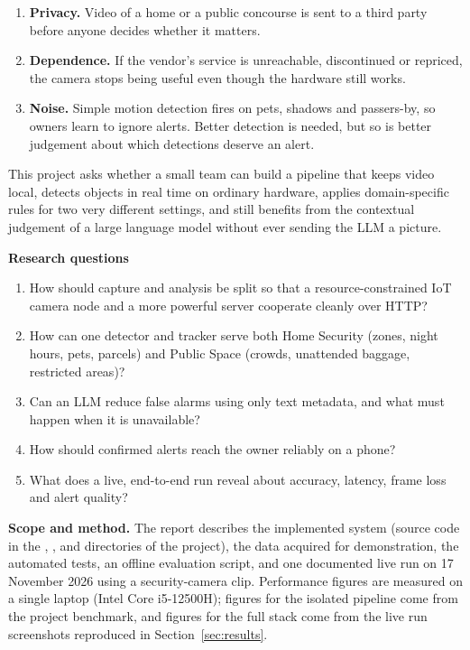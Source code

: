 \documentclass[11pt]{article}
\DeclareRobustCommand{\code}[1]{\texttt{\detokenize{#1}}}
\begin{document}
\begin{enumerate}
  \item \textbf{Privacy.} Video of a home or a public concourse is sent to a third party before anyone decides whether it matters.
  \item \textbf{Dependence.} If the vendor's service is unreachable, discontinued or repriced, the camera stops being useful even though the hardware still works.
  \item \textbf{Noise.} Simple motion detection fires on pets, shadows and passers-by, so owners learn to ignore alerts. Better detection is needed, but so is better judgement about which detections deserve an alert.
\end{enumerate}

This project asks whether a small team can build a pipeline that keeps video local, detects objects in real time on ordinary hardware, applies domain-specific rules for two very different settings, and still benefits from the contextual judgement of a large language model without ever sending the LLM a picture.

\textbf{Research questions}
\begin{enumerate}
  \item How should capture and analysis be split so that a resource-constrained IoT camera node and a more powerful server cooperate cleanly over HTTP?
  \item How can one detector and tracker serve both Home Security (zones, night hours, pets, parcels) and Public Space (crowds, unattended baggage, restricted areas)?
  \item Can an LLM reduce false alarms using only text metadata, and what must happen when it is unavailable?
  \item How should confirmed alerts reach the owner reliably on a phone?
  \item What does a live, end-to-end run reveal about accuracy, latency, frame loss and alert quality?
\end{enumerate}

\textbf{Scope and method.} The report describes the implemented system (source code in the \code{edge/}, \code{server/}, \code{frontend/} and \code{tests/} directories of the project), the data acquired for demonstration, the automated tests, an offline evaluation script, and one documented live run on 17 November 2026 using a security-camera clip. Performance figures are measured on a single laptop (Intel Core i5-12500H); figures for the isolated pipeline come from the project benchmark, and figures for the full stack come from the live run screenshots reproduced in Section~\ref{sec:results}.
\end{document}
